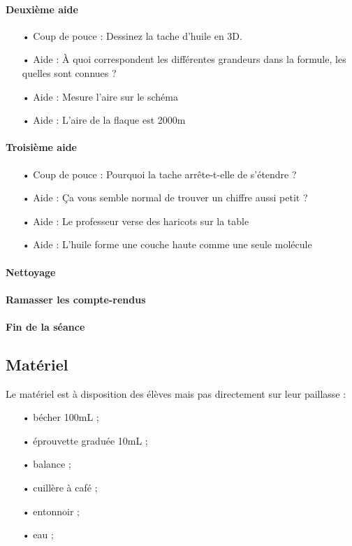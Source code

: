 \documentclass[12pt,a4paper]{article}
\begin{document}
\paragraph{Deuxième aide}
\begin{itemize}
\item[•] Coup de pouce : Dessinez la tache d'huile en 3D.
\item[•] Aide : À quoi correspondent les différentes grandeurs dans la formule, les quelles sont connues ?
\item[•] Aide : Mesure l'aire sur le schéma
\item[•] Aide : L'aire de la flaque est \unit{2000}{m\squared}
\end{itemize}

\paragraph{Troisième aide}
\begin{itemize}
\item[•] Coup de pouce : Pourquoi la tache arrête-t-elle de s'étendre ?
\item[•] Aide : Ça vous semble normal de trouver un chiffre aussi petit ?
\item[•] Aide : Le professeur verse des haricots sur la table
\item[•] Aide : L'huile forme une couche haute comme une seule molécule
\end{itemize}

\paragraph{Nettoyage}

\paragraph{Ramasser les compte-rendus}
 
\paragraph{Fin de la séance}

\subsection{Matériel}

Le matériel est à disposition des élèves mais pas directement sur leur paillasse :
\begin{itemize}
\item[•] bécher \unit{100}{mL} ;
\item[•] éprouvette graduée \unit{10}{mL} ;
\item[•] balance ;
\item[•] cuillère à café ;
\item[•] entonnoir ;
\item[•] eau ;
\end{itemize}
\end{document}
